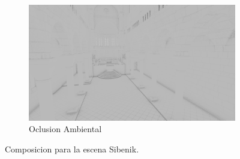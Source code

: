 \begin{figure}[H]
\begin{subfigure}[t]{.49\linewidth}
	\end{subfigure}%
	\hspace{0.01\textwidth}
	\begin{subfigure}[t]{.49\linewidth}
		\centering
		\caption*{Oclusion Ambiental}
		\captionsetup{justification=centering}
		\includegraphics[width=\linewidth]{media/finals/sibenik_ao.png}
	\end{subfigure}%
	\caption{Composicion para la escena Sibenik.}
	\label{fig:sibenik_final}
\end{figure}